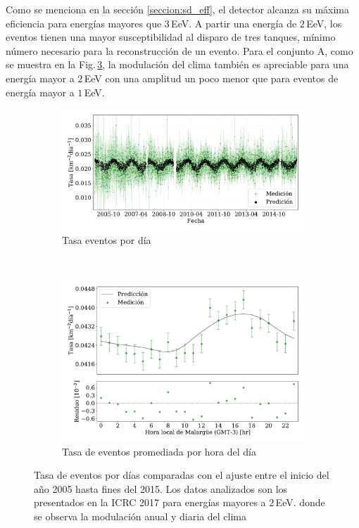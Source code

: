         Como se menciona en la sección \ref{seccion:sd_eff}, el detector alcanza su máxima eficiencia para energías mayores que 3\,EeV. A partir una energía de $2\,$EeV, los eventos tienen una mayor susceptibilidad al disparo de tres tanques, mínimo número necesario para la reconstrucción de un evento. Para el conjunto A, como se muestra en la Fig.\,\ref{fig:rate_2017_05-15_2EeV}, la modulación del clima también es apreciable para una energía mayor a $2\,$EeV con una amplitud un  poco menor que para eventos de energía mayor a $1\,$EeV. 

        \begin{figure}[H]
            \centering
            \begin{subfigure}[b]{0.875\textwidth}
            \includegraphics[width=\textwidth]{Graphs/rate_dayly/herald_old_above_2EeV_rate_day.pdf}
            \caption{Tasa eventos por día}\label{fig:rate_dayly_ICRC_2017_2EeV}
            \end{subfigure}\\
            \begin{subfigure}[b]{0.875\textwidth}
            \includegraphics[width=\textwidth]{Graphs/rate_hour_of_the_day/herald_old_above_2EeV_hour_of_the_day.pdf}
            \caption{Tasa de eventos promediada por hora del día }\label{fig:rate_hod_ICRC_2017_2EeV}
            \end{subfigure}%
            \caption{Tasa de eventos por días comparadas con el ajuste entre el inicio del año 2005 hasta fines del 2015. Los datos analizados son los presentados en la ICRC 2017 para energías mayores a $2\,$EeV. donde se observa la modulación anual y diaria del clima }\label{fig:rate_2017_05-15_2EeV}
        \end{figure}

